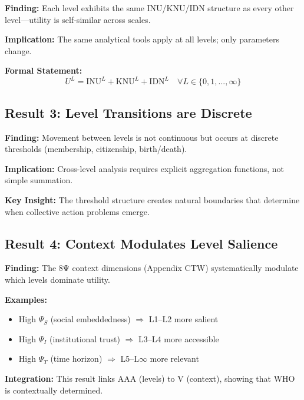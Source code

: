 \begin{tcolorbox}[colback=green!5!white, colframe=green!75!black]
\textbf{Finding:} Each level exhibits the same INU/KNU/IDN structure as every 
other level---utility is self-similar across scales.

\textbf{Implication:} The same analytical tools apply at all levels; only 
parameters change.

\textbf{Formal Statement:}
\[
U^L = \text{INU}^L + \text{KNU}^L + \text{IDN}^L \quad \forall L \in \{0, 1, ..., \infty\}
\]
\end{tcolorbox}

\subsection{Result 3: Level Transitions are Discrete}

\begin{tcolorbox}[colback=green!5!white, colframe=green!75!black]
\textbf{Finding:} Movement between levels is not continuous but occurs at 
discrete thresholds (membership, citizenship, birth/death).

\textbf{Implication:} Cross-level analysis requires explicit aggregation 
functions, not simple summation.

\textbf{Key Insight:} The threshold structure creates natural boundaries 
that determine when collective action problems emerge.
\end{tcolorbox}

\subsection{Result 4: Context Modulates Level Salience}

\begin{tcolorbox}[colback=green!5!white, colframe=green!75!black]
\textbf{Finding:} The 8Ψ context dimensions (Appendix CTW) systematically 
modulate which levels dominate utility.

\textbf{Examples:}
\begin{itemize}[nosep]
    \item High $\Psi_S$ (social embeddedness) $\Rightarrow$ L1--L2 more salient
    \item High $\Psi_I$ (institutional trust) $\Rightarrow$ L3--L4 more accessible
    \item High $\Psi_T$ (time horizon) $\Rightarrow$ L5--L$\infty$ more relevant
\end{itemize}

\textbf{Integration:} This result links AAA (levels) to V (context), showing 
that WHO is contextually determined.
\end{tcolorbox}



